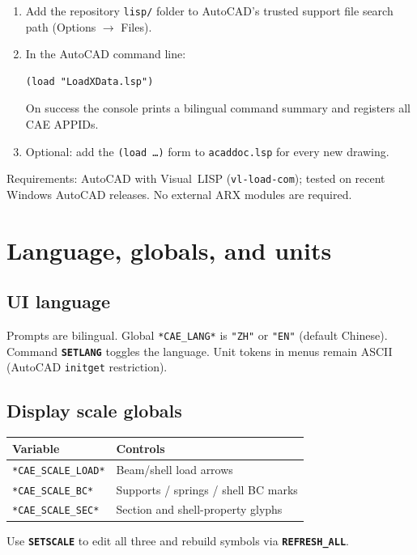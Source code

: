 \documentclass[a4paper]{ltxdoc}
\newcommand{\cadcmd}[1]{\texttt{\textbf{#1}}}
\newcommand{\caevar}[1]{\texttt{#1}}
\begin{document}
\begin{enumerate}[nosep]
  \item Add the repository \texttt{lisp/} folder to AutoCAD's trusted
        support file search path (Options $\rightarrow$ Files).
  \item In the AutoCAD command line:
\begin{verbatim}
(load "LoadXData.lsp")
\end{verbatim}
        On success the console prints a bilingual command summary and
        registers all CAE APPIDs.
  \item Optional: add the \texttt{(load \ldots)} form to
        \texttt{acaddoc.lsp} for every new drawing.
\end{enumerate}

Requirements: AutoCAD with Visual~LISP (\texttt{vl-load-com}); tested on
recent Windows AutoCAD releases.  No external ARX modules are required.

\section{Language, globals, and units}

\subsection{UI language}
Prompts are bilingual.  Global \caevar{*CAE\_LANG*} is \texttt{"ZH"} or
\texttt{"EN"} (default Chinese).  Command \cadcmd{SETLANG} toggles the
language.  Unit tokens in menus remain ASCII (AutoCAD \texttt{initget}
restriction).

\subsection{Display scale globals}
\begin{center}
\begin{tabular}{@{}ll@{}}
\toprule
Variable & Controls \\
\midrule
\caevar{*CAE\_SCALE\_LOAD*} & Beam/shell load arrows \\
\caevar{*CAE\_SCALE\_BC*}   & Supports / springs / shell BC marks \\
\caevar{*CAE\_SCALE\_SEC*}  & Section and shell-property glyphs \\
\bottomrule
\end{tabular}
\end{center}
Use \cadcmd{SETSCALE} to edit all three and rebuild symbols via
\cadcmd{REFRESH\_ALL}.
\end{document}
